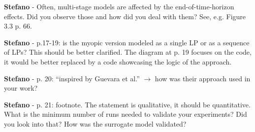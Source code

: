 \documentclass[12pt,a4paper]{article}
\begin{document}
\noindent 

\begin{mdframed}[style=manuscript] %

\end{mdframed}


\begin{mdframed}[style=comment] %
{\color{orange} \textbf{Stefano}} - Often, multi-stage models are affected by the end-of-time-horizon effects. Did you observe those and how did you deal with them? See, e.g. Figure 3.3 p. 66.
\end{mdframed}

\noindent 

\begin{mdframed}[style=manuscript] %

\end{mdframed}

\begin{mdframed}[style=comment] %
{\color{orange} \textbf{Stefano}} - p.17-19: is the myopic version modeled as a single LP or as a sequence of LPs? This should be better clarified. The diagram at p. 19 focuses on the code, it would be better replaced by a code showcasing the logic of the approach.
\end{mdframed}

\noindent 

\begin{mdframed}[style=manuscript] %

\end{mdframed}

\begin{mdframed}[style=comment] %
{\color{orange} \textbf{Stefano}} - p. 20: “inspired by Guevara et al.” $\rightarrow$ how was their approach used in your work?
\end{mdframed}

\noindent 

\begin{mdframed}[style=manuscript] %

\end{mdframed}

\begin{mdframed}[style=comment] %
{\color{orange} \textbf{Stefano}} - p. 21: footnote. The statement is qualitative, it should be quantitative. What is the minimum number of runs needed to validate your experiments? Did you look into that? How was the surrogate model validated?
\end{mdframed}
\end{document}

